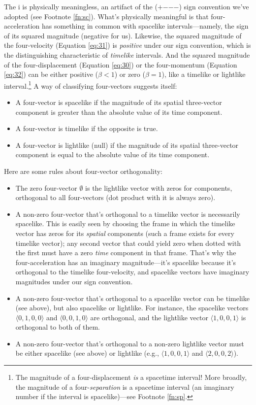 \documentclass[12pt]{article}
\begin{document}
The $\mathrm{i}$ is physically meaningless, an artifact of the ($+$$-$$-$$-$) sign convention we've adopted (see Footnote \ref{fn:sc}). What's physically meaningful is that four-acceleration has something in common with spacelike intervals---namely, the sign of its squared magnitude (negative for us). Likewise, the squared magnitude of the four-velocity (Equation \ref{eq:31}) is \emph{positive} under our sign convention, which is the distinguishing characteristic of \emph{timelike} intervals. And the squared magnitude of the four-displacement (Equation \ref{eq:30}) or the four-momentum (Equation \ref{eq:32}) can be either positive ($\beta < 1$) or zero ($\beta = 1$), like a timelike or lightlike interval.\footnote{The magnitude of a four-displacement \emph{is} a spacetime interval! More broadly, the magnitude of a four-\emph{separation} is a spacetime interval (an imaginary number if the interval is spacelike)---see Footnote \ref{fn:sp}.} A way of classifying four-vectors suggests itself:
\begin{itemize}
\item A four-vector is spacelike if the magnitude of its spatial three-vector component is greater than the absolute value of its time component.
\item A four-vector is timelike if the opposite is true.
\item A four-vector is lightlike (null) if the magnitude of its spatial three-vector component is equal to the absolute value of its time component.
\end{itemize}
Here are some rules about four-vector orthogonality:
\begin{itemize}
\item The zero four-vector \mbox{\boldmath $\emptyset$} is the lightlike vector with zeros for components, orthogonal to all four-vectors (dot product with it is always zero).
\item A non-zero four-vector that's orthogonal to a timelike vector is necessarily spacelike. This is easily seen by choosing the frame in which the timelike vector has zeros for its \emph{spatial} components (such a frame exists for every timelike vector); any second vector that could yield zero when dotted with the first must have a zero \emph{time} component in that frame. That's why the four-acceleration has an imaginary magnitude---it's spacelike because it's orthogonal to the timelike four-velocity, and spacelike vectors have imaginary magnitudes under our sign convention.
\item A non-zero four-vector that's orthogonal to a spacelike vector can be timelike (see above), but also spacelike or lightlike. For instance, the spacelike vectors $\langle 0, 1, 0, 0 \rangle$ and $\langle 0, 0, 1, 0 \rangle$ are orthogonal, and the lightlike vector $\langle 1, 0, 0, 1 \rangle$ is orthogonal to both of them.
\item A non-zero four-vector that's orthogonal to a non-zero lightlike vector must be either spacelike (see above) or lightlike (e.g., $\langle 1, 0, 0, 1 \rangle$ and $\langle 2, 0, 0, 2 \rangle$).
\end{itemize}
\end{document}
